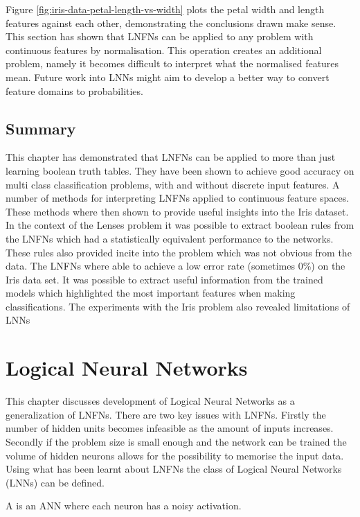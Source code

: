 Figure \ref{fig:iris-data-petal-length-vs-width} plots the petal width and length features against each other, demonstrating the conclusions drawn make sense.\\

This section has shown that LNFNs can be applied to any problem with continuous features by normalisation. This operation creates an additional problem, namely it becomes difficult to interpret what the normalised features mean. Future work into LNNs might aim to develop a better way to convert feature domains to probabilities.

\section{Summary}
This chapter has demonstrated that LNFNs can be applied to more than just learning boolean truth tables. They have been shown to achieve good accuracy on multi class classification problems, with and without discrete input features. A number of methods for interpreting LNFNs applied to continuous feature spaces. These methods where then shown to provide useful insights into the Iris dataset.\\

In the context of the Lenses problem it was possible to extract boolean rules from the LNFNs which had a statistically equivalent performance to the networks. These rules also provided incite into the problem which was not obvious from the data. The LNFNs where able to achieve a low error rate (sometimes 0\%) on the Iris data set. It was possible to extract useful information from the trained models which highlighted the most important features when making classifications. The experiments with the Iris problem also revealed limitations of LNNs

\chapter{Logical Neural Networks} \label{C:lnn}
This chapter discusses development of Logical Neural Networks as a generalization of LNFNs. There are two key issues with LNFNs. Firstly the number of hidden units becomes infeasible as the amount of inputs increases. Secondly if the problem size is small enough and the network can be trained the volume of hidden neurons allows for the possibility to memorise the input data. Using what has been learnt about LNFNs the class of Logical Neural Networks (LNNs) can be defined.

\begin{definition}
	A  is an ANN where each neuron has a noisy activation.
\end{definition}

